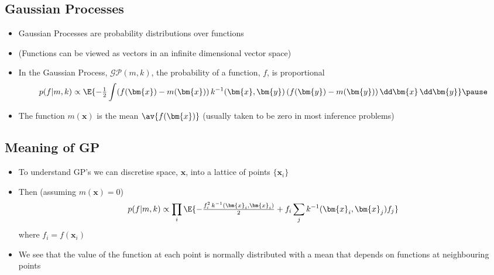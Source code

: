 \Outline %

\begin{slide}
\section{Gaussian Processes}

\begin{PauseHighLight}
  \begin{itemize}
  \item Gaussian Processes are probability distributions over
    functions\pause
  \item (Functions can be viewed as vectors in an infinite dimensional
    vector space)\pause
  \item In the Gaussian Process, $\mathcal{GP}(m, k)$, the probability of
    a function, $f$, is proportional
    \begin{align*}
      p(f|m,k) \propto \E{-\tfrac{1}{2} \int (f(\bm{x})-m(\bm{x})) 
      \, k^{-1}(\bm{x},\bm{y}) \, (f(\bm{y}) -m(\bm{y})) \, \dd \bm{x}
      \, \dd \bm{y}}\pause
    \end{align*}
  \item The function $m(\bm{x})$ is the mean $\av{f(\bm{x})}$ (usually
    taken to be zero in most inference problems)\pause
  \end{itemize}
\end{PauseHighLight}


\end{slide}


\begin{slide}
\section[-1]{Meaning of GP}

\begin{PauseHighLight}
  \begin{itemize}
  \item To understand GP's we can discretise space, $\bm{x}$, into a
    lattice of points $\{\bm{x}_i\}$\pause
  \item Then (assuming $m(\bm{x})=0$)
    \begin{align*}
      p(f|m,k) \propto \prod_i \E{-\tfrac{f_i^2\, k^{-1}(\bm{x}_i,\bm{x}_i)}{
      2} + f_i  \sum_j
      k^{-1}(\bm{x}_i,\bm{x}_j) f_j}
    \end{align*}
    where $f_i=f(\bm{x}_i)$\pause
  \item We see that the value of the function at each point is normally
    distributed with a mean that depends on functions at neighbouring
    points\pause
  \end{itemize}
\end{PauseHighLight}

\end{slide}


